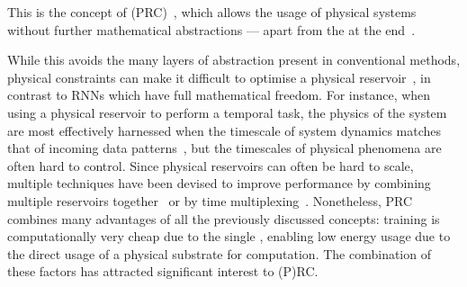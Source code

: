 This is the concept of  (PRC)~\cite{PRC}, which allows the usage of physical systems without further mathematical abstractions --- apart from the  at the end~\cite{RC_RecentAdvances}. \par
While this avoids the many layers of abstraction present in conventional  methods, physical constraints can make it difficult to optimise a physical reservoir~\cite{RC_RecentAdvances}, in contrast to RNNs which have full mathematical freedom.
For instance, when using a physical reservoir to perform a temporal task, the physics of the system are most effectively harnessed when the timescale of system dynamics matches that of incoming data patterns~\cite{KUR-24}, but the timescales of physical phenomena are often hard to control.
Since physical reservoirs can often be hard to scale, multiple techniques have been devised to improve performance by combining multiple reservoirs together~\cite{EvaluatingRestrictedESNs,RotatingNeuronsRC} or by time multiplexing~\cite{appeltant2011information}.
Nonetheless, PRC combines many advantages of all the previously discussed concepts: training is computationally very cheap due to the single , enabling low energy usage due to the direct usage of a physical substrate for computation.
The combination of these factors has attracted significant interest to (P)RC.

